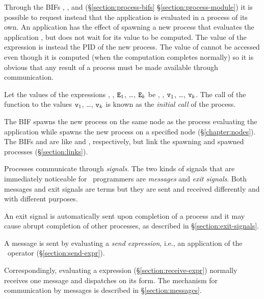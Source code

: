 Through the BIFs , , 
and  (\ifOld\S\ref{section:process-bifs}\fi
\ifNew\S\ref{section:process-module}\fi)
it is possible to request instead that the application is evaluated in a process
of its own.  An application 
has the effect of spawning a new process that evaluates the application
, but does not wait for its
value to be computed.  The value of the expression
 is instead the
PID of the new process.  The value of
 cannot be accessed even
though it is computed (when the computation completes normally) so it is
obvious that any result of a process must be made available through
communication.

Let the values of the expressions , , ${\tt{\sl E}}_1$, \ldots, ${\tt{\sl E}}_k$
be , , ${\tt{\sl v}}_1$, \ldots, ${\tt{\sl v}}_k$.  The call of
the function  to the values  ${\tt{\sl v}}_1$, \ldots, ${\tt{\sl v}}_k$
is known as the \emph{initial call} of the process.

The BIF  spawns the new process on the same node as the
process evaluating the application while
 spawns the new process on a specified node (\S\ref{chapter:nodes}).
The BIFs  and  are like
 and , respectively, but link the spawning and
spawned processes (\S\ref{section:links}).

Processes communicate through \emph{signals}.  The two kinds
of signals that are immediately noticeable for \Erlang\ programmers
are \emph{messages} and \emph{exit signals}.
Both messages and exit signals are terms but they are sent and received
differently and with different purposes.

An exit signal is automatically sent upon completion of a process
and it may cause abrupt completion of other processes, as described
in \S\ref{section:exit-signals}.

A message is sent by evaluating a \emph{send expression}, i.e.,
an application of the \T{!}\ operator (\S\ref{section:send-expr}).
\iffalse
The value of the left-hand operand should be the PID of the receiving
process (or an atom that is registered to identify a PID)
and the value of the right-hand operand should be the message to be sent.
\fi
Correspondingly, evaluating a 
expression (\S\ref{section:receive-expr}) normally receives one message and
dispatches on its form.
The mechanism for communication by messages is described in
\S\ref{section:messages}.

